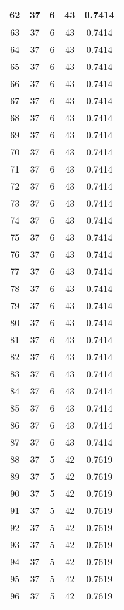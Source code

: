 \documentclass[letterpaper, 12pt]{article}
\begin{document}
\begin{longtable}{|c|c|c|c|c|}
\hline
62 & 37 & 6 & 43 & 0.7414 \\
\hline
63 & 37 & 6 & 43 & 0.7414 \\
\hline
64 & 37 & 6 & 43 & 0.7414 \\
\hline
65 & 37 & 6 & 43 & 0.7414 \\
\hline
66 & 37 & 6 & 43 & 0.7414 \\
\hline
67 & 37 & 6 & 43 & 0.7414 \\
\hline
68 & 37 & 6 & 43 & 0.7414 \\
\hline
69 & 37 & 6 & 43 & 0.7414 \\
\hline
70 & 37 & 6 & 43 & 0.7414 \\
\hline
71 & 37 & 6 & 43 & 0.7414 \\
\hline
72 & 37 & 6 & 43 & 0.7414 \\
\hline
73 & 37 & 6 & 43 & 0.7414 \\
\hline
74 & 37 & 6 & 43 & 0.7414 \\
\hline
75 & 37 & 6 & 43 & 0.7414 \\
\hline
76 & 37 & 6 & 43 & 0.7414 \\
\hline
77 & 37 & 6 & 43 & 0.7414 \\
\hline
78 & 37 & 6 & 43 & 0.7414 \\
\hline
79 & 37 & 6 & 43 & 0.7414 \\
\hline
80 & 37 & 6 & 43 & 0.7414 \\
\hline
81 & 37 & 6 & 43 & 0.7414 \\
\hline
82 & 37 & 6 & 43 & 0.7414 \\
\hline
83 & 37 & 6 & 43 & 0.7414 \\
\hline
84 & 37 & 6 & 43 & 0.7414 \\
\hline
85 & 37 & 6 & 43 & 0.7414 \\
\hline
86 & 37 & 6 & 43 & 0.7414 \\
\hline
87 & 37 & 6 & 43 & 0.7414 \\
\hline
88 & 37 & 5 & 42 & 0.7619 \\
\hline
89 & 37 & 5 & 42 & 0.7619 \\
\hline
90 & 37 & 5 & 42 & 0.7619 \\
\hline
91 & 37 & 5 & 42 & 0.7619 \\
\hline
92 & 37 & 5 & 42 & 0.7619 \\
\hline
93 & 37 & 5 & 42 & 0.7619 \\
\hline
94 & 37 & 5 & 42 & 0.7619 \\
\hline
95 & 37 & 5 & 42 & 0.7619 \\
\hline
96 & 37 & 5 & 42 & 0.7619 \\

\end{longtable}
\end{document}
